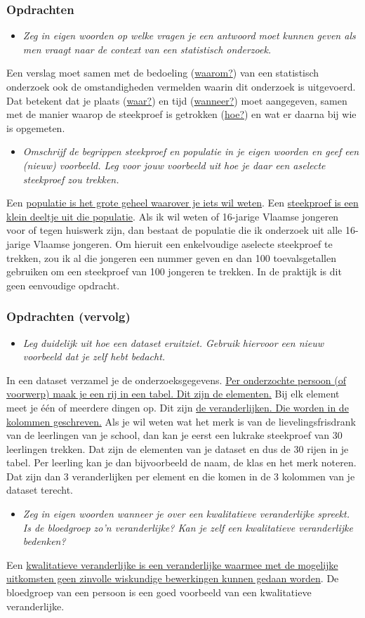 \documentclass[dutch]{beamer}
\newcommand{\vraag}[1]{\begin{itemize}\item[Vraag:] {\it #1}\end{itemize}}
\begin{document}
\begin{frame}
\frametitle{Opdrachten}
\vraag{Zeg in eigen woorden op welke vragen je een antwoord moet kunnen geven als men vraagt
naar de context van een statistisch onderzoek.}
\pause
Een verslag moet samen met de bedoeling (\uline{waarom?}) van een statistisch onderzoek ook de
omstandigheden vermelden waarin dit onderzoek is uitgevoerd. Dat betekent dat je plaats
(\uline{waar?}) en tijd (\uline{wanneer?}) moet aangegeven, samen met de manier waarop de steekproef is
getrokken (\uline{hoe?}) en wat er daarna bij wie is opgemeten.
\pause
\vraag{Omschrijf de begrippen steekproef en populatie in je eigen woorden en geef een (nieuw)
voorbeeld. Leg voor jouw voorbeeld uit hoe je daar een aselecte steekproef zou
trekken.}
\pause
Een \uline{populatie is het grote geheel waarover je iets wil weten}. Een \uline{steekproef is een klein
deeltje uit die populatie}. Als ik wil weten of 16-jarige Vlaamse jongeren voor of tegen
huiswerk zijn, dan bestaat de populatie die ik onderzoek uit alle 16-jarige Vlaamse jongeren.
Om hieruit een enkelvoudige aselecte steekproef te trekken, zou ik al die jongeren een
nummer geven en dan 100 toevalsgetallen gebruiken om een steekproef van 100 jongeren te
trekken. In de praktijk is dit geen eenvoudige opdracht.
\end{frame}

\begin{frame}
\frametitle{Opdrachten {\smallskip (vervolg)}}
\vraag{Leg duidelijk uit hoe een dataset eruitziet. Gebruik hiervoor een nieuw voorbeeld dat je zelf
hebt bedacht.}
\pause
In een dataset verzamel je de onderzoeksgegevens. \uline{Per onderzochte persoon (of voorwerp)
maak je een rij in een tabel. Dit zijn de elementen.} Bij elk element meet je één of meerdere
dingen op. Dit zijn \uline{de veranderlijken. Die worden in de kolommen geschreven.}
Als je wil weten wat het merk is van de lievelingsfrisdrank van de leerlingen van je school,
dan kan je eerst een lukrake steekproef van 30 leerlingen trekken. Dat zijn de elementen van
je dataset en dus de 30 rijen in je tabel. Per leerling kan je dan bijvoorbeeld de naam, de klas
en het merk noteren. Dat zijn dan 3 veranderlijken per element en die komen in de 3
kolommen van je dataset terecht.
\pause
\vraag{Zeg in eigen woorden wanneer je over een kwalitatieve veranderlijke spreekt. Is de bloedgroep zo’n veranderlijke? Kan je zelf een kwalitatieve veranderlijke bedenken?}
\pause
Een \uline{kwalitatieve veranderlijke is een veranderlijke waarmee met de mogelijke uitkomsten
geen zinvolle wiskundige bewerkingen kunnen gedaan worden}. De bloedgroep van een
persoon is een goed voorbeeld van een kwalitatieve veranderlijke.
\end{frame}
\end{document}
